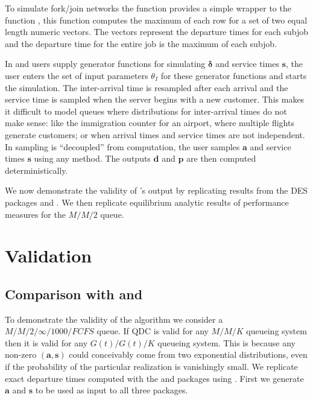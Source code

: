 \documentclass[article]{jss}
\begin{document}
To simulate fork/join networks the  function  provides a simple wrapper to the  function , this function computes the maximum of each row for a set of two equal length numeric vectors. The vectors represent the departure times for each subjob and the departure time for the entire job is the maximum of each subjob. 

In  and  users supply generator functions for simulating $\mathbf{\delta}$ and service times $\mathbf{s}$, the user enters the set of input parameters $\theta_I$ for these generator functions and starts the simulation. The inter-arrival time is resampled after each arrival and the service time is sampled when the server begins with a new customer. This makes it difficult to model queues where distributions for inter-arrival times do not make sense: like the immigration counter for an airport, where multiple flights generate customers; or when arrival times and service times are not independent. In  sampling is ``decoupled'' from computation, the user samples $\mathbf{a}$ and service times $\mathbf{s}$ using any method. The outputs $\mathbf{d}$ and $\mathbf{p}$ are then computed deterministically. 

We now demonstrate the validity of 's output by replicating results from the DES packages  and . We then replicate equilibrium analytic results of performance measures for the $M/M/2$ queue. 

\section{Validation} \label{sec:Validation}

\subsection[Comparison with simmer and simpy]{Comparison with  and }

To demonstrate the validity of the algorithm we consider a $M/M/2/\infty/1000/FCFS$ queue. If QDC is valid for any $M/M/K$ queueing system then it is valid for any $G(t)/G(t)/K$ queueing system. This is because any non-zero $\mathbf{(a,s)}$ could conceivably come from two exponential distributions, even if the probability of the particular realization is vanishingly small. We replicate exact departure times computed with the  and  packages using . First we generate $\mathbf{a}$ and $\mathbf{s}$ to be used as input to all three packages. 
\end{document}
